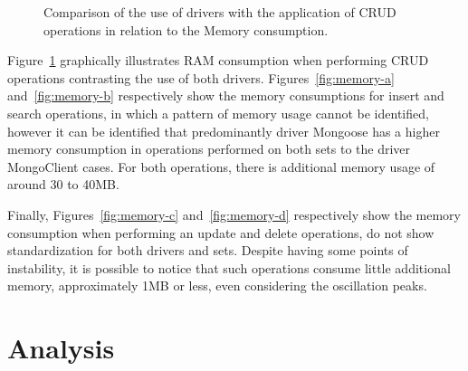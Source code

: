 \documentclass{svproc}
\begin{document}
\begin{figure}[!ht]
    \caption{Comparison of the use of drivers with the application of CRUD operations in relation to the Memory consumption.}
    \label{fig:memory}
\end{figure}

Figure~\ref{fig:memory} graphically illustrates RAM consumption when performing CRUD operations contrasting the use of both drivers.
Figures~\ref{fig:memory-a} and~\ref{fig:memory-b} respectively show the memory consumptions for insert and search operations, in which a pattern of memory usage cannot be identified, however it can be identified that predominantly driver Mongoose has a higher memory consumption in operations performed on both sets to the driver MongoClient cases.
For both operations, there is additional memory usage of around 30 to 40MB.

Finally, Figures~\ref{fig:memory-c} and~\ref{fig:memory-d} respectively show the memory consumption when performing an update and delete operations, do not show standardization for both drivers and sets. 
Despite having some points of instability, it is possible to notice that such operations consume little additional memory, approximately 1MB or less, even considering the oscillation peaks.

\section{Analysis}
\label{section:discussao}
\end{document}
